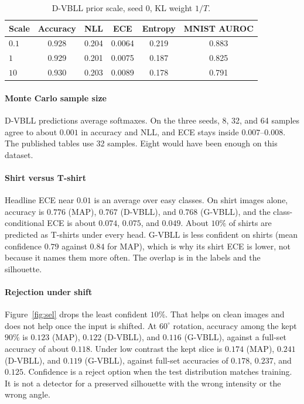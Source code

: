 \documentclass[11pt,a4paper]{article}
\begin{document}
\begin{table}[H]
\centering
\caption{D-VBLL prior scale, seed 0, KL weight $1/T$.}
\label{tab:prior}
\begin{tabular}{lccccc}
\toprule
Scale & Accuracy & NLL & ECE & Entropy & MNIST AUROC \\
\midrule
$0.1$ & 0.928 & 0.204 & 0.0064 & 0.219 & 0.883 \\
$1$ & 0.929 & 0.201 & 0.0075 & 0.187 & 0.825 \\
$10$ & 0.930 & 0.203 & 0.0089 & 0.178 & 0.791 \\
\bottomrule
\end{tabular}
\end{table}

\paragraph{Monte Carlo sample size}
D-VBLL predictions average softmaxes.
On the three seeds, 8, 32, and 64 samples agree to about $0.001$ in accuracy and NLL, and ECE stays inside $0.007$--$0.008$.
The published tables use 32 samples. Eight would have been enough on this dataset.

\paragraph{Shirt versus T-shirt}
Headline ECE near $0.01$ is an average over easy classes.
On shirt images alone, accuracy is $0.776$ (MAP), $0.767$ (D-VBLL), and $0.768$ (G-VBLL), and the class-conditional ECE is about $0.074$, $0.075$, and $0.049$.
About $10\%$ of shirts are predicted as T-shirts under every head.
G-VBLL is less confident on shirts (mean confidence $0.79$ against $0.84$ for MAP), which is why its shirt ECE is lower, not because it names them more often.
The overlap is in the labels and the silhouette.

\paragraph{Rejection under shift}
Figure~\ref{fig:sel} drops the least confident $10\%$.
That helps on clean images and does not help once the input is shifted.
At $60^{\circ}$ rotation, accuracy among the kept $90\%$ is $0.123$ (MAP), $0.122$ (D-VBLL), and $0.116$ (G-VBLL), against a full-set accuracy of about $0.118$.
Under low contrast the kept slice is $0.174$ (MAP), $0.241$ (D-VBLL), and $0.119$ (G-VBLL), against full-set accuracies of $0.178$, $0.237$, and $0.125$.
Confidence is a reject option when the test distribution matches training. It is not a detector for a preserved silhouette with the wrong intensity or the wrong angle.
\end{document}
